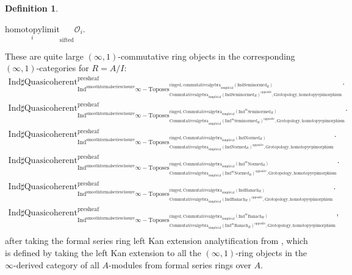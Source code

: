 \documentclass[11pt]{book}
\theoremstyle{definition}
\newtheorem{definition}[theorem]{Definition}
\numberwithin{equation}{section}
\begin{document}
\begin{definition}
\begin{center}
$\underset{i}{\text{homotopylimit}}_\text{sifted}\mathcal{O}_i$.
\end{center}
These are quite large $(\infty,1)$-commutative ring objects in the corresponding $(\infty,1)$-categories for $R=A/I$:
\begin{align}
\mathrm{Ind}\mathrm{\sharp Quasicoherent}^{\text{presheaf}}_{\mathrm{Ind}^\text{smoothformalseriesclosure}\infty-\mathrm{Toposes}^{\mathrm{ringed},\mathrm{commutativealgebra}_{\mathrm{simplicial}}(\mathrm{Ind}\mathrm{Seminormed}_R)}_{\mathrm{Commutativealgebra}_{\mathrm{simplicial}}(\mathrm{Ind}\mathrm{Seminormed}_R)^\mathrm{opposite},\mathrm{Grotopology,homotopyepimorphism}}}. \\
\mathrm{Ind}\mathrm{\sharp Quasicoherent}^{\text{presheaf}}_{\mathrm{Ind}^\text{smoothformalseriesclosure}\infty-\mathrm{Toposes}^{\mathrm{ringed},\mathrm{Commutativealgebra}_{\mathrm{simplicial}}(\mathrm{Ind}^m\mathrm{Seminormed}_R)}_{\mathrm{Commutativealgebra}_{\mathrm{simplicial}}(\mathrm{Ind}^m\mathrm{Seminormed}_R)^\mathrm{opposite},\mathrm{Grotopology,homotopyepimorphism}}}.\\
\mathrm{Ind}\mathrm{\sharp Quasicoherent}^{\text{presheaf}}_{\mathrm{Ind}^\text{smoothformalseriesclosure}\infty-\mathrm{Toposes}^{\mathrm{ringed},\mathrm{Commutativealgebra}_{\mathrm{simplicial}}(\mathrm{Ind}\mathrm{Normed}_R)}_{\mathrm{Commutativealgebra}_{\mathrm{simplicial}}(\mathrm{Ind}\mathrm{Normed}_R)^\mathrm{opposite},\mathrm{Grotopology,homotopyepimorphism}}}.\\
\mathrm{Ind}\mathrm{\sharp Quasicoherent}^{\text{presheaf}}_{\mathrm{Ind}^\text{smoothformalseriesclosure}\infty-\mathrm{Toposes}^{\mathrm{ringed},\mathrm{Commutativealgebra}_{\mathrm{simplicial}}(\mathrm{Ind}^m\mathrm{Normed}_R)}_{\mathrm{Commutativealgebra}_{\mathrm{simplicial}}(\mathrm{Ind}^m\mathrm{Normed}_R)^\mathrm{opposite},\mathrm{Grotopology,homotopyepimorphism}}}.\\
\mathrm{Ind}\mathrm{\sharp Quasicoherent}^{\text{presheaf}}_{\mathrm{Ind}^\text{smoothformalseriesclosure}\infty-\mathrm{Toposes}^{\mathrm{ringed},\mathrm{Commutativealgebra}_{\mathrm{simplicial}}(\mathrm{Ind}\mathrm{Banach}_R)}_{\mathrm{Commutativealgebra}_{\mathrm{simplicial}}(\mathrm{Ind}\mathrm{Banach}_R)^\mathrm{opposite},\mathrm{Grotopology,homotopyepimorphism}}}.\\
\mathrm{Ind}\mathrm{\sharp Quasicoherent}^{\text{presheaf}}_{\mathrm{Ind}^\text{smoothformalseriesclosure}\infty-\mathrm{Toposes}^{\mathrm{ringed},\mathrm{Commutativealgebra}_{\mathrm{simplicial}}(\mathrm{Ind}^m\mathrm{Banach}_R)}_{\mathrm{Commutativealgebra}_{\mathrm{simplicial}}(\mathrm{Ind}^m\mathrm{Banach}_R)^\mathrm{opposite},\mathrm{Grotopology,homotopyepimorphism}}},\\ 
\end{align}
after taking the formal series ring left Kan extension analytification from \cite[Section 4.2]{BBM}, which is defined by taking the left Kan extension to all the $(\infty,1)$-ring objects in the $\infty$-derived category of all $A$-modules from formal series rings over $A$.\\
\end{definition}
\end{document}
